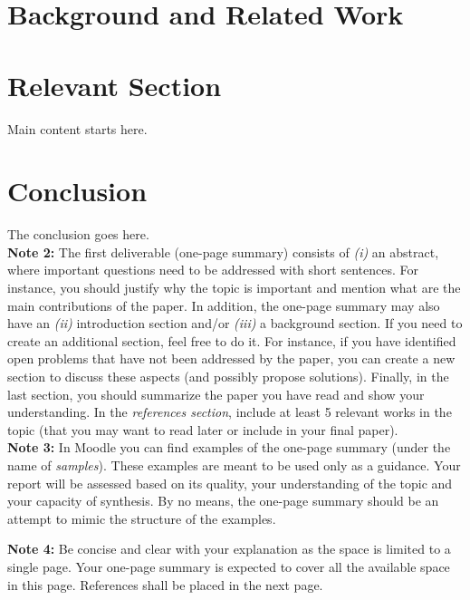 \documentclass[sigconf]{acmart}
\begin{document}
\section{Background and Related Work}

\section{Relevant Section}

Main content starts here. \nocite{*}


\section{Conclusion}
The conclusion goes here.\\

\textbf{Note 2:} The first deliverable (one-page summary) consists of \emph{(i)} an abstract, where important questions need to be addressed with short sentences. For instance, you should justify why the topic is important and mention what are the main contributions of the paper. In addition, the one-page summary may also have an \emph{(ii)} introduction section and/or \emph{(iii)} a background section. If you need to create an additional section, feel free to do it. For instance, if you have identified open problems that have not been addressed by the paper, you can create a new section to discuss these aspects (and possibly propose solutions). Finally, in the last section, you should summarize the paper you have read and show your understanding. In the \emph{references section}, include at least 5 relevant works in the topic (that you may want to read later or include in your final paper). \\

\textbf{Note 3:} In Moodle you can find examples of the one-page summary (under the name of \emph{samples}). These examples are meant to be used only as a guidance. Your report will be assessed based on its quality, your understanding of the topic and your capacity of synthesis. By no means, the one-page summary should be an attempt to mimic the structure of the examples. 

\textbf{Note 4:} Be concise and clear with your explanation as the space is limited to a single page. Your one-page summary is expected to cover all the available space in this page. References shall be placed in the next page.
\end{document}
